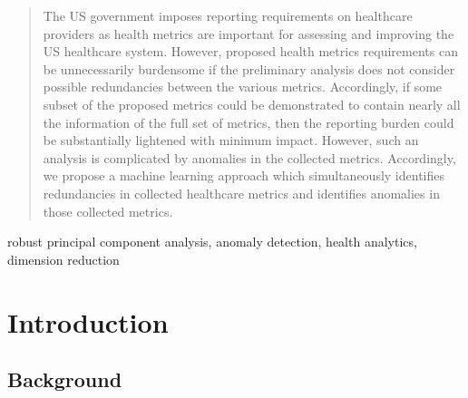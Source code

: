 \documentclass[conference]{IEEEtran}
\begin{document}
\begin{abstract}


The US government imposes reporting requirements on healthcare providers as health metrics are important for assessing and improving the US healthcare system.  However, proposed health metrics requirements can be unnecessarily burdensome if the preliminary analysis does not consider possible redundancies between the various metrics.  Accordingly, if some subset of the proposed metrics could be demonstrated to contain nearly all the information of  the full set of metrics,
then the reporting burden could be substantially  lightened with minimum impact.  However, such an analysis is complicated by anomalies in the collected metrics.  Accordingly, we propose a machine learning approach which simultaneously identifies redundancies in collected healthcare metrics and identifies anomalies in those collected metrics.
\end{abstract}

\begin{IEEEkeywords}
robust principal component analysis, anomaly
detection, health analytics, dimension reduction
\end{IEEEkeywords} 

\section{Introduction}

\subsection{Background}
\end{document}
